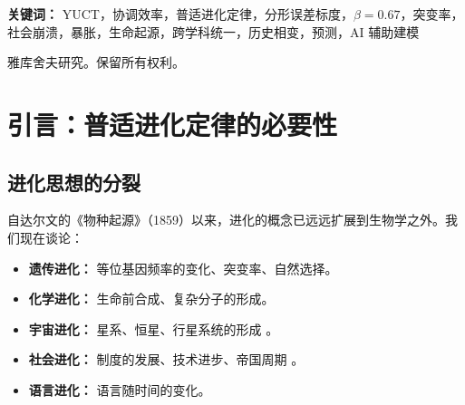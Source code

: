 \documentclass[12pt,a4paper]{article}
\theoremstyle{remark}
\begin{document}
\begin{titlepage}
\begin{center}
\begin{minipage}{0.9\textwidth}
\begin{abstract}
					\noindent
					\textbf{本版本新增内容：} 我们将该框架扩展到一个元层面，应用于文明本身的进化。通过建模积累知识 $Z(t)$ 的增长及其与 $K_{\text{eff}}$ 的耦合，我们识别出一系列对应于重大协调突破（文字、宗教、印刷术、科学等）的历史相变。直接从 YUCT 推导出的自加速（双曲线）增长模型解释了历史加速的步伐。然后，该模型被用来预测下一个重大相变。在对崩溃与奇点分岔进行严格分析之后，我们得出结论，唯一数学上一致的结果是一个奇点——全球协调的质变——预计在公元 2049–2055 年左右发生。该数学框架为所有学科的进化提供了统一语言，将其从描述性科学转变为预测性科学。
				\end{abstract}
			\end{minipage}
			
			\vspace{1cm}
			
			\noindent
			\small\textbf{关键词：} YUCT，协调效率，普适进化定律，分形误差标度，$\beta=0.67$，突变率，社会崩溃，暴胀，生命起源，跨学科统一，历史相变，预测，AI 辅助建模
			
			\vspace{0.5cm}
			
			\noindent
			 雅库舍夫研究。保留所有权利。
		\end{center}
	\end{titlepage}
	
	\tableofcontents
	\newpage
	
	\section{引言：普适进化定律的必要性}
	
	\subsection{进化思想的分裂}
	
	自达尔文的《物种起源》（1859）\cite{Darwin1859}以来，进化的概念已远远扩展到生物学之外。我们现在谈论：
	
	\begin{itemize}
		\item \textbf{遗传进化：} 等位基因频率的变化、突变率、自然选择。
		\item \textbf{化学进化：} 生命前合成、复杂分子的形成。
		\item \textbf{宇宙进化：} 星系、恒星、行星系统的形成 \cite{Chaisson2001}。
		\item \textbf{社会进化：} 制度的发展、技术进步、帝国周期 \cite{Boulding1978}。
		\item \textbf{语言进化：} 语言随时间的变化。
	\end{itemize}
	
\end{document}
